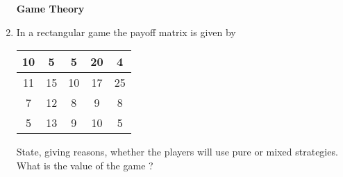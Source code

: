 \documentclass[11pt, a4paper]{article}
\begin{document}
\begin{enumerate}
\begin{table}[!htbp]
\end{table}





















\newpage

\begin{center}
\textbf{\huge Game Theory}
\end{center}


\vspace{50pt}


	\item In a rectangular game the payoff matrix is given by
	\begin{table}[h]
	\def\arraystretch{1.5}
	
	\begin{center}
	\begin{tabular}{|c|c|c|c|c|}
	
	\hline
	
	10 & 5 & 5 & 20 & 4 \\
	
	\hline
	
	11 & 15 & 10 & 17 & 25 \\
	
	\hline
	
	7 & 12 & 8 & 9 & 8 \\
	
	\hline
	
	5 & 13 & 9 & 10 & 5 \\
	
	\hline
	
	\end{tabular}
	\end{center}
	
	\end{table}

State, giving reasons, whether the players will use pure or mixed strategies. What is the value of the game ?







\vspace{30pt}








\end{enumerate}
\end{document}
